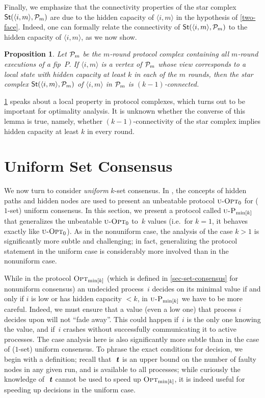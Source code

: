 \documentclass[11pt]{article}
\newtheorem{proposition}{Proposition}
\theoremstyle{definition}
\newcommand{\OptMink}{\mbox{$\mbox{\sc Opt}_{\min[k]}$}}
\newcommand{\defemph}[1]{\textbf{\textit{#1}}}
\newcommand{\tee}{\,\defemph{t}}
\newcommand{\UOptZ}{\mbox{$\mbox{{\sc u-Opt}}_0$}}
\newcommand{\UOptMink}{\mbox{$\mbox{\sc u-P}_{\min[k]}$}}
\DeclareMathOperator{\Star}{\sf St}
\newcommand{\ang}[1]{\langle{#1}\rangle}
\newcommand{\cP}{\ensuremath{\mathcal{P}}}
\newcommand{\fip}{{\it fip}}
\begin{document}
Finally, we emphasize
that the connectivity properties of the
star
complex $\Star(\ang{i,m}, \cP_m)$
are due to
the hidden capacity of $\ang{i,m}$ in the hypothesis of \cref{two-face}.
Indeed,
one can formally relate
the connectivity of $\Star(\ang{i,m}, \cP_m)$ to the hidden capacity of $\ang{i,m}$,
as
we now show.

\begin{proposition}
\label{hidden-capacity-connectivity}
Let ${\cal P}_m$ be the $m$-round protocol complex
containing all $m$-round executions of
a \fip\ $P$.
If $\ang{i,m}$ is a vertex of ${\cal P}_m$
whose view corresponds to a local state with hidden capacity
at least $k$ in each of the $m$ rounds,
then the star complex $\Star(\ang{i,m}, {\cal P}_m)$ of $\ang{i,m}$ in ${\cal P}_m$ is $(k-1)$-connected.
\end{proposition}

\cref{hidden-capacity-connectivity} speaks about a local property in protocol
complexes, which turns out to be important for optimality analysis.
It is unknown whether the converse of this lemma is true, namely,
whether
$(k-1)$-connectivity of the star complex implies hidden capacity at least $k$ in every round.

\section{Uniform Set Consensus}
\label{subsec-uni-k}

We now turn to consider {\em uniform} $k$-set consensus.
In \cite{AYY-DISC}, the concepts of
hidden paths and hidden nodes
are used to present an unbeatable protocol $\UOptZ$ for ($1$-set) uniform consensus.
In this section, we present a protocol called $\UOptMink$ that generalizes the unbeatable $\UOptZ$ to~$k$ values (i.e.\ for $k=1$, it behaves exactly like $\UOptZ$).
As in the nonuniform case, the analysis of the case $k>1$ is significantly more
subtle and challenging; in fact, generalizing the protocol statement in the uniform case is
considerably
more involved than in the nonuniform case.

While in the protocol $\OptMink$ (which is defined in \cref{sec-set-consensus} for nonuniform consensus) an undecided process~$i$ decides on its minimal value if and only if
$i$ is low or has hidden capacity $<k$, in $\UOptMink$ we have to be more careful. Indeed, we must ensure that a value (even a low one) that process $i$ decides upon  will not ``fade away''.
This could happen if~$i$ is the only one knowing the value,  and if~$i$ crashes without successfully communicating it to active processes.
The case analysis here is also significantly more subtle than in the case of ($1$-set) uniform consensus. To phrase the exact conditions for decision, we begin with a definition; recall that~$\tee$ is
an upper bound on the
number of faulty nodes in any given run, and is available to all processes; while curiously the knowledge of~$\tee$ cannot be used to speed up $\OptMink$, it is indeed useful for speeding up decisions in the uniform case.
\end{document}
